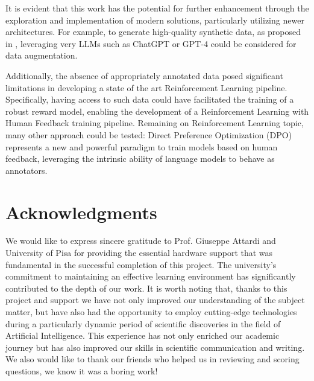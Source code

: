 \documentclass{article}
\begin{document}
It is evident that this work has the potential for further enhancement through the exploration and implementation of modern solutions, particularly utilizing newer architectures. For example, to generate high-quality synthetic data, as proposed in \cite{veselovsky2023generating}, leveraging very LLMs such as ChatGPT or GPT-4 could be considered for data augmentation.

Additionally, the absence of appropriately annotated data posed significant limitations in developing a state of the art Reinforcement Learning pipeline. Specifically, having access to such data could have facilitated the training of a robust reward model, enabling the development of a Reinforcement Learning with Human Feedback training pipeline. Remaining on Reinforcement Learning topic, many other approach could be tested: Direct Preference Optimization (DPO) \cite{rafailov2023direct} represents a new and powerful paradigm to train models based on human feedback, leveraging the intrinsic ability of language models to behave as annotators.

\section{Acknowledgments}
We would like to express sincere gratitude to Prof. Giuseppe Attardi and University of Pisa for providing the essential hardware support that was fundamental in the successful completion of this project. The university's commitment to maintaining an effective learning environment has significantly contributed to the depth of our work. It is worth noting that, thanks to this project and support we have not only improved our understanding of the subject matter, but have also had the opportunity to employ cutting-edge technologies during a particularly dynamic period of scientific discoveries in the field of Artificial Intelligence. This experience has not only enriched our academic journey but has also improved our skills in scientific communication and writing. We also would like to thank our friends who helped us in reviewing and scoring questions, we know it was a boring work!
\newpage

\printbibliography[heading=bibintoc]
\end{document}

